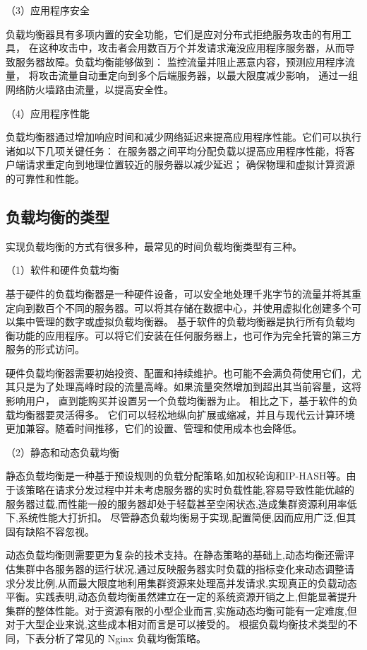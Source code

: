（3）应用程序安全

负载均衡器具有多项内置的安全功能，它们是应对分布式拒绝服务攻击的有用工具，
在这种攻击中，攻击者会用数百万个并发请求淹没应用程序服务器，从而导致服务器故障。负载均衡能够做到：
监控流量并阻止恶意内容，预测应用程序流量，
将攻击流量自动重定向到多个后端服务器，以最大限度减少影响，
通过一组网络防火墙路由流量，以提高安全性。

（4）应用程序性能

负载均衡器通过增加响应时间和减少网络延迟来提高应用程序性能。它们可以执行诸如以下几项关键任务：
在服务器之间平均分配负载以提高应用程序性能，将客户端请求重定向到地理位置较近的服务器以减少延迟；
确保物理和虚拟计算资源的可靠性和性能。

\subsection{负载均衡的类型}

实现负载均衡的方式有很多种，最常见的时间负载均衡类型有三种。

（1）软件和硬件负载均衡

基于硬件的负载均衡器是一种硬件设备，可以安全地处理千兆字节的流量并将其重定向到数百个不同的服务器。可以将其存储在数据中心，并使用虚拟化创建多个可以集中管理的数字或虚拟负载均衡器。
基于软件的负载均衡器是执行所有负载均衡功能的应用程序。可以将它们安装在任何服务器上，也可作为完全托管的第三方服务的形式访问。

硬件负载均衡器需要初始投资、配置和持续维护。也可能不会满负荷使用它们，尤其只是为了处理高峰时段的流量高峰。如果流量突然增加到超出其当前容量，这将影响用户，
直到能购买并设置另一个负载均衡器为止。
相比之下，基于软件的负载均衡器要灵活得多\cite{常智2013高性能}。
它们可以轻松地纵向扩展或缩减，并且与现代云计算环境更加兼容。随着时间推移，它们的设置、管理和使用成本也会降低。

（2）静态和动态负载均衡

静态负载均衡是一种基于预设规则的负载分配策略,如加权轮询和IP-HASH等。由于该策略在请求分发过程中并未考虑服务器的实时负载性能,容易导致性能优越的服务器过载,而性能一般的服务器却处于轻载甚至空闲状态,造成集群资源利用率低下,系统性能大打折扣。
尽管静态负载均衡易于实现,配置简便,因而应用广泛,但其固有缺陷不容忽视。

动态负载均衡则需要更为复杂的技术支持。在静态策略的基础上,动态均衡还需评估集群中各服务器的运行状况,通过反映服务器实时负载的指标变化来动态调整请求分发比例,从而最大限度地利用集群资源来处理高并发请求,实现真正的负载动态平衡。实践表明,动态负载均衡虽然建立在一定的系统资源开销之上,但能显著提升集群的整体性能。对于资源有限的小型企业而言,实施动态均衡可能有一定难度,但对于大型企业来说,这些成本相对而言是可以接受的。
根据负载均衡技术类型的不同，下表分析了常见的 Nginx 负载均衡策略。

